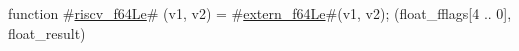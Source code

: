 function #\hyperref[sailRISCVzriscvzyf64Le]{riscv\_f64Le}# (v1, v2) = {
  #\hyperref[sailRISCVzexternzyf64Le]{extern\_f64Le}#(v1, v2);
  (float_fflags[4 .. 0], float_result)
}
